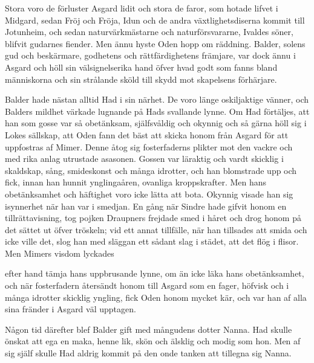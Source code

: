 

Stora voro de förluster Asgard lidit och stora de faror, som hotade
lifvet i Midgard, sedan Fröj och Fröja, Idun och de andra
växtlighetsdiserna kommit till Jotunheim, och sedan naturvärkmästarne
och naturförsvararne, Ivaldes söner, blifvit gudarnes fiender. Men ännu
hyste Oden hopp om räddning. Balder, solens gud och beskärmare,
godhetens och rättfärdighetens främjare, var dock ännu i Asgard och höll
sin välsignelserika hand öfver hvad godt som fanns bland människorna och
sin strålande sköld till skydd mot skapelsens förhärjare.

Balder hade nästan alltid Had i sin närhet. De voro länge oskiljaktige
vänner, och Balders mildhet värkade lugnande på Hads svallande lynne. Om
Had förtäljes, att han som gosse var så obetänksam, själfsvåldig och
okynnig och så gärna höll sig i Lokes sällskap, att Oden fann det bäst
att skicka honom från Asgard för att uppfostras af Mimer. Denne åtog sig
fosterfaderns plikter mot den vackre och med rika anlag utrustade
asasonen. Gossen var läraktig och vardt skicklig i skaldskap, sång,
smideskonst och många idrotter, och han blomstrade upp och fick, innan
han hunnit ynglingaåren, ovanliga kroppskrafter. Men hans obetänksamhet
och häftighet voro icke lätta att bota. Okynnig visade han sig
isynnerhet när han var i smedjan. En gång när Sindre hade gifvit honom
en tillrättavisning, tog pojken Draupners frejdade smed i håret och drog
honom på det sättet ut öfver tröskeln; vid ett annat tillfälle, när han
tillsades att smida och icke ville det, slog han med släggan ett sådant
slag i städet, att det flög i flisor. Men Mimers visdom lyckades

efter hand tämja hans uppbrusande lynne, om än icke läka hans
obetänksamhet, och när fosterfadern återsändt honom till Asgard som en
fager, höfvisk och i många idrotter skicklig yngling, fick Oden honom
mycket kär, och var han af alla sina fränder i Asgard väl upptagen.

Någon tid därefter blef Balder gift med mångudens dotter Nanna. Had
skulle önskat att ega en maka, henne lik, skön och älsklig och modig som
hon. Men af sig själf skulle Had aldrig kommit på den onde tanken att
tillegna sig Nanna.

